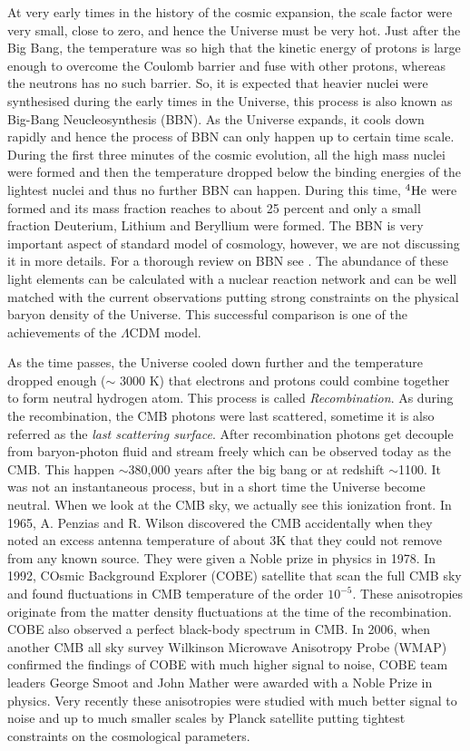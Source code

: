 At  very early times in the history of the cosmic expansion, the scale factor 
were very small, close to zero, and hence the Universe must be very hot. Just
after the Big Bang, the temperature was so high that the kinetic energy
of protons is large enough to overcome the Coulomb barrier and fuse with other
protons, whereas the neutrons has no such barrier. So, it is expected that
heavier nuclei were synthesised during the early times in the Universe, this
process is also known as Big-Bang Neucleosynthesis (BBN). As the Universe expands, 
it cools down rapidly and hence the process of BBN can only
happen up to certain time scale. During the first three minutes of the cosmic
evolution, all the high mass nuclei were formed and then the temperature
dropped below the binding energies of the lightest nuclei and thus no
further BBN can happen. During this time, $^4{\rm He}$ were formed and 
its mass fraction reaches to about 25 percent and only a small fraction 
Deuterium, Lithium and Beryllium were formed. 
The BBN is very important
aspect of standard model of cosmology, however, we are not discussing it in more
details. For a thorough review on BBN
see \cite{}. The abundance of these light elements 
can be calculated with a nuclear reaction network and can be well matched
with the current observations putting strong constraints on the physical
baryon density of the Universe. This successful comparison is one of the
achievements of the $\Lambda$CDM model.

As the time passes, the Universe cooled down further and the temperature
dropped enough ($\sim$ 3000 K) that electrons and protons could combine 
together to form neutral hydrogen
atom. This process is called {\it Recombination}. As during the recombination,
the CMB photons were last scattered, sometime it is also referred
as the {\it last scattering surface}. After recombination photons 
get decouple from baryon-photon fluid and stream freely which
can be observed today as the CMB. 
This happen $\sim$380,000 years after the big bang or at redshift 
$\sim$1100. It was not an instantaneous process, but in a short time
the Universe become neutral. When we look at the CMB sky, we actually see
this ionization front. In 1965, A. Penzias and R. Wilson discovered the CMB
accidentally when they noted an excess antenna temperature of about 3K that
they could not remove from any known source. They were given a Noble prize in 
physics in 1978. In 1992, COsmic Background Explorer (COBE) satellite that
scan the full CMB sky and found fluctuations in CMB temperature of the 
order $10^{-5}$. These anisotropies originate from the matter density
fluctuations at the time of the recombination. COBE also observed a perfect
black-body spectrum in CMB. In 2006, when another CMB all sky survey 
Wilkinson Microwave Anisotropy Probe (WMAP) confirmed the findings of COBE
with much higher signal to noise, COBE team leaders George Smoot and John Mather
were awarded with a Noble Prize in physics. Very recently these anisotropies were studied
with much better signal to noise and up to much smaller scales by Planck satellite
putting tightest constraints on the cosmological parameters.

